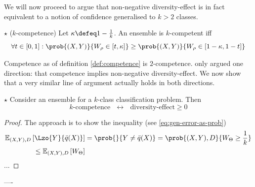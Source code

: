 \documentclass[../main.tex]{subfiles}
\begin{document}
We will now proceed to argue that non-negative diversity-effect is in fact equivalent to a notion of confidence generalised to $k > 2$ classes. 
\begin{definition} $\star$ ($k$-competence) Let $\kappa \defeq 1 - \frac{1}{k}$. An ensemble is $k$-competent iff
$$
\forall t \in [0,1]:
\prob{(X,Y) }{W_{\rho} \in \left[ t, \kappa \right]}
\geq \prob{(X,Y) }{W_{\rho} \in \left[ 1-\kappa, 1-t \right]}
$$
\end{definition}
Competence as of definition \ref{def:competence} is $2$-competence.
\cite{theisen} only argued one direction: that competence implies non-negative diversity-effect. We now show that a very similar line of argument actually holds in both directions.
\begin{theorem} $\star$ Consider an ensemble for a $k$-class classification problem. Then
$$
\text{$k$-competence}  ~ ~ ~\leftrightarrow~ ~ ~  \text{diversity-effect} \geq 0
$$
\end{theorem}
\begin{proof}
The approach is to show the inequality (see \ref{eq:gen-error-as-prob})
$$
\begin{align}
\mathbb{E}_{(X,Y),D }\left[ \Lzo{Y}{\bar{q}(X)} \right] &= \prob{}{Y \not= \bar{q}(X)} = \prob{(X,Y) ,D}{W_{\Theta} \geq \frac{1}{k}} \\
\leq \mathbb{E}_{(X,Y), D}\left[ W_{\Theta}  \right] 
\end{align}
$$
...
\end{proof}

----


\end{document}
